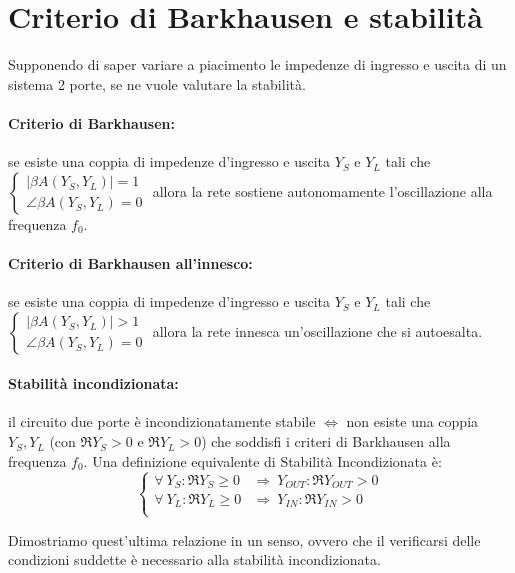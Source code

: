 \section{Criterio di Barkhausen e stabilità}

Supponendo di saper variare a piacimento  le impedenze di ingresso e uscita di un sistema 2 porte, se ne vuole valutare la stabilità.

\paragraph{Criterio di Barkhausen:} se esiste una coppia di impedenze d'ingresso e uscita $Y_S$ e $Y_L$ tali che $\begin{cases}
| \beta A (Y_S,Y_L) | = 1\\
\angle \beta A (Y_S,Y_L)  = 0
\end{cases}$ allora la rete sostiene autonomamente l'oscillazione alla frequenza $f_0$.

\paragraph{Criterio di Barkhausen all'innesco:} se esiste una coppia di impedenze d'ingresso e uscita $Y_S$ e $Y_L$ tali che $\begin{cases}
| \beta A (Y_S,Y_L) | > 1\\
\angle \beta A (Y_S,Y_L)  = 0
\end{cases}$ allora la rete innesca un'oscillazione che si autoesalta.

\paragraph{Stabilità incondizionata:} il circuito due porte è incondizionatamente stabile $\Leftrightarrow$ non esiste una coppia $Y_S, Y_L$ (con $\Re{Y_S}>0$ e $\Re{Y_L}>0$) che soddisfi i criteri di Barkhausen alla frequenza $f_0$. Una definizione equivalente di Stabilità Incondizionata è:
\[
\begin{cases}
\forall ~ Y_S : \Re{Y_S} \ge 0 & \Rightarrow ~ Y_{OUT} : \Re{Y_{OUT}}>0\\
\forall ~ Y_L : \Re{Y_L} \ge 0 & \Rightarrow ~ Y_{IN} : \Re{Y_{IN}}>0\\
\end{cases}
\]

Dimostriamo quest'ultima relazione in un senso, ovvero che il verificarsi delle condizioni suddette è necessario alla stabilità incondizionata.

